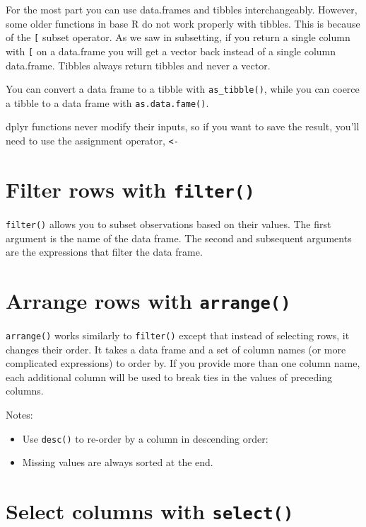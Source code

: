 \documentclass[]{book}
\providecommand{\tightlist}{%
  \setlength{\itemsep}{0pt}\setlength{\parskip}{0pt}}
\theoremstyle{definition}
\theoremstyle{definition}
\theoremstyle{definition}
\theoremstyle{remark}
\let\BeginKnitrBlock\begin \let\EndKnitrBlock\end
\begin{document}
For the most part you can use data.frames and tibbles interchangeably.
However, some older functions in base R do not work properly with
tibbles. This is because of the \texttt{{[}} subset operator. As we saw
in subsetting, if you return a single column with \texttt{{[}} on a
data.frame you will get a vector back instead of a single column
data.frame. Tibbles always return tibbles and never a vector.

You can convert a data frame to a tibble with \texttt{as\_tibble()},
while you can coerce a tibble to a data frame with
\texttt{as.data.fame()}.

\BeginKnitrBlock{rmdimportant}
dplyr functions never modify their inputs, so if you want to save the
result, you'll need to use the assignment operator,
\texttt{\textless{}-}
\EndKnitrBlock{rmdimportant}

\section{\texorpdfstring{Filter rows with
\texttt{filter()}}{Filter rows with filter()}}\label{filter-rows-with-filter}

\texttt{filter()} allows you to subset observations based on their
values. The first argument is the name of the data frame. The second and
subsequent arguments are the expressions that filter the data frame.

\section{\texorpdfstring{Arrange rows with
\texttt{arrange()}}{Arrange rows with arrange()}}\label{arrange-rows-with-arrange}

\texttt{arrange()} works similarly to \texttt{filter()} except that
instead of selecting rows, it changes their order. It takes a data frame
and a set of column names (or more complicated expressions) to order by.
If you provide more than one column name, each additional column will be
used to break ties in the values of preceding columns.

Notes:

\begin{itemize}
\tightlist
\item
  Use \texttt{desc()} to re-order by a column in descending order:
\item
  Missing values are always sorted at the end.
\end{itemize}

\section{\texorpdfstring{Select columns with
\texttt{select()}}{Select columns with select()}}\label{select-columns-with-select}
\end{document}
